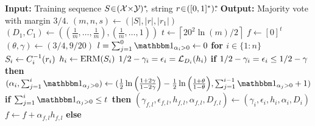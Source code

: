 \begin{algorithm}[H]
\caption{$ \as $ $\cA$}\label{alg:AdaBoostSample}
\begin{algorithmic}[1]
\State\textbf{Input:} Training sequence $S\negmedspace\in\negmedspace(\mathcal{X}\negmedspace\times\negmedspace \mathcal{Y})^{*}\negmedspace,$ string $r\negmedspace \in\negmedspace ([0,1]^{*})^{*}\negmedspace\negmedspace.$ 
\State\textbf{Output:} Majority vote with margin $ 3/4.$
\State $(m,n,s) \gets (|S|,|r|,|r_{1}|)$ \label{alg:AdaBoostSamplemset} \label{alg:AdaBoostsamplesetn}\label{alg:AdaBoostsamplesets}
\State $(D_1,C_{1})\gets ((\frac{1}{m},\ldots,\frac{1}{m}),(\frac{1}{m},\ldots,1))$ \label{alg:AdaBoostSamplesetDone} \label{alg:AdaBoostSamplesetCone}
\State $t \gets \left\lceil 20^{2}\ln(m)/2\right\rceil$\label{alg:AdaBoostSampletset} 
\State $f \gets [0]^{t}$\label{alg:AdaBoostSamplesetf} 
\State $(\theta,\gamma)\gets (3/4,9/20)$ \label{alg:AdaBoostSamplethetaset}  \label{alg:AdaBoostSamplegammaset}
\State $l=\sum_{j=1}^{0}\ind_{\alpha_{i}>0}\gets 0$ \label{alg:AdaBoostSamplesettingl}
\State\textbf{for $ i \in \{ 1:n \} $ } \label{alg:AdaBoostSampleforloop}
\State\hspace{0.5cm}\vline\quad $S_i \gets C_i^{-1}(r_{i})$\label{alg:AdaBoostSample:sample} 
\State\hspace{0.5cm}\vline\quad$h_i\leftarrow \mathrm{ERM} (S_i )$\label{alg:AdaBoostSampletraining} 
\State\hspace{0.5cm}\vline\quad$1/2-\gamma_{i}=\epsilon_i=\operatorname{\mathcal{L}}_{D_{i}}(h_i)$\label{alg:AdaBoostSamplelossoftrained} 
\State\hspace{0.5cm}\vline\quad\textbf{if $1/2-\gamma_{i}=\epsilon_{i}\leq 1/2-\gamma$ \label{alg:AdaBoostsamplenonzeroweight} then}
\State\hspace{1cm}\vline\quad$(\alpha_i,\sum_{j=1}^{i}\ind_{\alpha_j>0})\gets(\frac{1}{2}\ln{\left(\frac{1+2\gamma}{1-2\gamma}\right)- \frac{1}{2}\ln{\left(\frac{1+\theta}{1-\theta} \right)}},\sum_{j=1}^{i-1}\ind_{\alpha_j>0}+1)$\label{alg:AdaBoostSamplealphaset}
\State\hspace{1cm}\vline\quad\textbf{if $\sum_{j=1}^{i}\ind_{\alpha_j>0}\leq t$ \label{alg:AdaBoostSampleearlystop} then}
\State\hspace{1.5cm}\vline\quad$(\gamma_{f,l},\epsilon_{f,l},h_{f,l},\alpha_{f,l},D_{f,l})\gets (\gamma_{i},\epsilon_{i},h_{i},\alpha_{i},D_{i})$\label{alg:AdaBoostSampleupdatel}
\State\hspace{1.5cm}\vline\quad$f\gets f+\alpha_{f,l} h_{f,l}$\label{alg:AdaBoostSampleaddsf}
\State\hspace{0.5cm}\vline\quad\textbf{else }

\end{algorithmic}
\end{algorithm}

